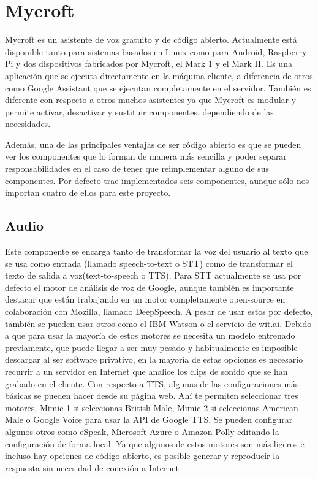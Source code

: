 \section{Mycroft}
Mycroft es un asistente de voz gratuito y de código abierto. Actualmente está disponible tanto para sistemas basados en Linux como para Android, Raspberry Pi y dos dispositivos fabricados por Mycroft, el Mark 1 y el Mark II.
Es una aplicación que se ejecuta directamente en la máquina cliente, a diferencia de otros como Google Assistant que se ejecutan completamente en el servidor. También es diferente con respecto a otros muchos asistentes ya que Mycroft es modular y permite activar, desactivar y sustituir componentes, dependiendo de las necesidades.

Además, una de las principales ventajas de ser código abierto es que se pueden ver los componentes que lo forman de manera más sencilla y poder separar responsabilidades en el caso de tener que reimplementar alguno de sus componentes. Por defecto trae implementados seis componentes, aunque sólo nos importan cuatro de ellos para este proyecto.
\subsection{Audio}
Este componente se encarga tanto de transformar la voz del usuario al texto que se usa como entrada (llamado speech-to-text o STT) como de transformar el texto de salida a voz(text-to-speech o TTS).
Para STT actualmente se usa por defecto el motor de análisis de voz de Google, aunque también es importante destacar que están trabajando en un motor completamente open-source en colaboración con Mozilla, llamado DeepSpeech. A pesar de usar estos por defecto, también se pueden usar otros como el IBM Watson o el servicio de wit.ai. Debido a que para usar la mayoría de estos motores se necesita un modelo entrenado previamente, que puede llegar a ser muy pesado y habitualmente es imposible descargar al ser software privativo, en la mayoría de estas opciones es necesario recurrir a un servidor en Internet que analice los clips de sonido que se han grabado en el cliente.
Con respecto a TTS, algunas de las configuraciones más básicas se pueden hacer desde su página web. Ahí te permiten seleccionar tres motores, Mimic 1 si seleccionas British Male, Mimic 2 si seleccionas American Male o Google Voice para usar la API de Google TTS. Se pueden configurar algunos otros como eSpeak, Microsoft Azure o Amazon Polly editando la configuración de forma local. Ya que algunos de estos motores son más ligeros e incluso hay opciones de código abierto, es posible generar y reproducir la respuesta sin necesidad de conexión a Internet.
